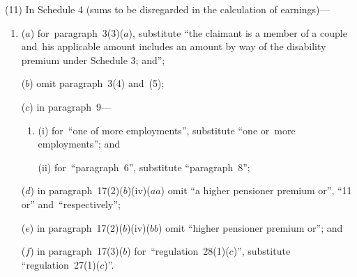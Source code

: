 \documentclass[12pt,a4paper]{article}
\begin{document}
(11) In Schedule 4 (sums to be disregarded in the calculation of earnings)—
\begin{enumerate}\item[]
($a$) for~paragraph~3(3)($a$), substitute “the claimant is a member of a couple and~his applicable amount includes an amount by way of the disability premium under Schedule 3; and”;

($b$) omit paragraph~3(4) and~(5);

($c$) in paragraph~9—
\begin{enumerate}\item[]
(i) for~“one of more employments”, substitute “one or~more employments”; and

(ii) for~“paragraph~6”, substitute “paragraph~8”;
\end{enumerate}

($d$) in paragraph~17(2)($b$)(iv)($aa$)  omit “a higher pensioner premium or”, “11 or” and~“respectively”;

($e$) in paragraph~17(2)($b$)(iv)($bb$)  omit “higher pensioner premium or”; and

($f$) in paragraph~17(3)($b$)  for~“regulation~28(1)($c$)”, substitute “regulation~27(1)($c$)”.
\end{enumerate}
\end{document}
